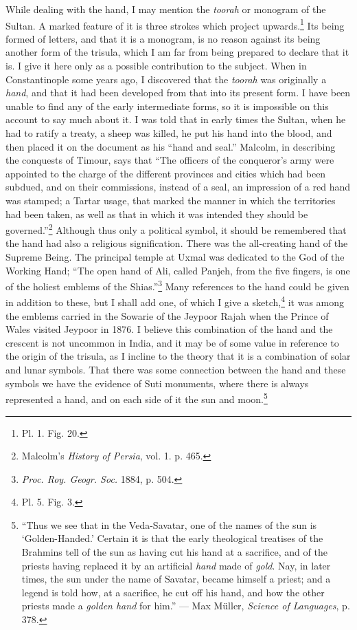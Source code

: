 \documentclass[a4paper, 11pt, oneside, english, landscape, twocolumn]{article}
\begin{document}
While dealing with the hand, I may mention the \emph{toorah} or monogram of the Sultan. A marked feature of it is three strokes which project upwards.\footnote{Pl. 1. Fig. 20.} Its being formed of letters, and that it is a monogram, is no reason against its being another form of the trisula, which I am far from being prepared to declare that it is. I give it here only as a possible contribution to the subject. When in Constantinople some years ago, I discovered that the \emph{toorah} was originally a \emph{hand}, and that it had been developed from that into its present form. I have been unable to find any of the early intermediate forms, so it is impossible on this account to say much about it. I was told that in early times the Sultan, when he had to ratify a treaty, a sheep was killed, he put his hand into the blood, and then placed it on the document as his ``hand and seal.'' Malcolm, in describing the conquests of Timour, says that ``The officers of the conqueror's army were appointed to the charge of the different provinces and cities which had been subdued, and on their commissions, instead of a seal, an impression of a red hand was stamped; a Tartar usage, that marked the manner in which the territories had been taken, as well as that in which it was intended they should be governed.''\footnote{Malcolm's \emph{History of Persia}, vol. 1. p. 465.} Although thus only a political symbol, it should be remembered that the hand had also a religious signification. There was the all-creating hand of the Supreme Being. The principal temple at Uxmal was dedicated to the God of the Working Hand; ``The open hand of Ali, called Panjeh, from the five fingers, is one of the holiest emblems of the Shias.''\footnote{\emph{Proc. Roy. Geogr. Soc.} 1884, p. 504.} Many references to the hand could be given in addition to these, but I shall add one, of which I give a sketch,\footnote{Pl. 5. Fig. 3.} it was among the emblems carried in the Sowarie of the Jeypoor Rajah when the Prince of Wales visited Jeypoor in 1876. I believe this combination of the hand and the crescent is not uncommon in India, and it may be of some value in reference to the origin of the trisula, as I incline to the theory that it is a combination of solar and lunar symbols. That there was some connection between the hand and these symbols we have the evidence of Suti monuments, where there is always represented a hand, and on each side of it the sun and moon.\footnote{``Thus we see that in the Veda-Savatar, one of the names of the sun is `Golden-Handed.' Certain it is that the early theological treatises of the Brahmins tell of the sun as having cut his hand at a sacrifice, and of the priests having replaced it by an artificial \emph{hand} made of \emph{gold}. Nay, in later times, the sun under the name of Savatar, became himself a priest; and a legend is told how, at a sacrifice, he cut off his hand, and how the other priests made a \emph{golden hand} for him.'' --- Max Müller, \emph{Science of Languages}, p. 378.}
\end{document}
